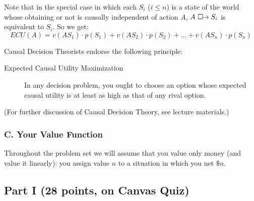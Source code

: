 \documentclass[12pt,letterpaper]{article}
\begin{document}
{Note that in the special case in which each $S_i$ ($i \leq n$) is a state of the world whose obtaining or not is causally independent of action $A$, $A \ \Box\hspace{-1.6mm}\rightarrow S_i$ is equivalent to $S_i$. So we get:
\[
ECU(A) = v(A S_1) \cdot p(S_1) +  v(A S_2) \cdot p(S_2) + \ldots +  v(A S_n) \cdot p(S_n)
\]


Causal Decision Theorists endorse the following principle:
\begin{description}
\item[Expected Causal Utility Maximization]
In any decision problem, you ought to choose an option whose expected causal utility is at least as high as that of any rival option.
\end{description}
(For further discussion of Causal Decision Theory, see lecture materials.)


\subsubsection*{C. Your Value Function} 


Throughout the problem set we will assume that you value only money (and value it linearly): you assign value \(n\) to a situation in which you net \(\$n\).
}

\subsection*{Part I (28 points, on Canvas Quiz)} 
\end{document}
